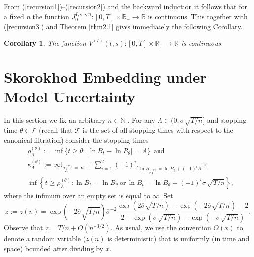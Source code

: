 \documentclass{amsart}
\newtheorem{cor}[thm]{Corollary}
\numberwithin{equation}{section}
\begin{document}
From (\ref{recursion1})--(\ref{recursion2}) and the backward induction it follows that
for a fixed $n$ the function $J^{I,\cdot,\cdot\cdot,n}_0:[0,T]\times\mathbb R_{+}\rightarrow\mathbb R$ is
continuous. This together with (\ref{recursion3}) and Theorem \ref{thm2.1} gives immediately the following
Corollary.\\
\begin{cor}\label{cor2.3}
The function $V^{(I)}(t,s):[0,T]\times\mathbb R_{+}\rightarrow\mathbb R$
is continuous.
\end{cor}

\section{Skorokhod Embedding under Model Uncertainty}\label{sec:3}\setcounter{equation}{0}
In this section we fix an arbitrary $n\in\mathbb N$ .
For any $A\in (0, \overline{\sigma}\sqrt{T/n}]$ and stopping time $\theta\in\mathcal T$ (recall that $\mathcal T$ is the set of all stopping times
with respect to the canonical filtration)
consider the stopping times
\begin{eqnarray}\label{3.0}
&\rho^{(\theta)}_A:=\inf\{t\geq \theta: |\ln B_t-\ln B_{\theta}|=A\} \ \ \mbox{and}\\
&\kappa^{(\theta)}_A:=\infty\mathbb I_{\rho^{(\theta)}_A=\infty}+\sum_{i=1}^2 (-1)^i \mathbb I_{\ln  B_{\rho^{(\theta)}_A}=\ln B_{\theta}+(-1)^i A}\times\nonumber\\
&\inf\left\{t\geq \rho^{(\theta)}_A: \ln B_t=\ln B_{\theta} \ \mbox{or} \
\ln B_t=\ln B_{\theta}+(-1)^i \overline{\sigma}\sqrt{T/n}\right\},\nonumber
\end{eqnarray}
where the infimum over an empty set is equal to $\infty$.
Set
\[z:=z(n)=\exp(-2\overline{\sigma}\sqrt{T/n})\overline{\sigma}^{-2}
\frac{\exp(2\overline{\sigma}\sqrt{T/n})+\exp(-2\overline{\sigma}\sqrt{T/n})-2}{2+\exp(\overline{\sigma}\sqrt{T/n})+\exp(-\overline{\sigma}\sqrt{T/n})}.\]
Observe that $z=T/n+O(n^{-3/2})$.
As usual, we use the convention $O(x)$ to denote
a random variable ($z(n)$ is deterministic) that is uniformly (in time and space) bounded after dividing by $x$.
\end{document}
